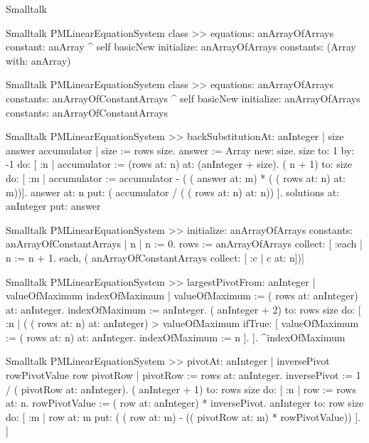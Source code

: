 \begin{displaycode}{Smalltalk}
\begin{displaycode}{Smalltalk}
PMLinearEquationSystem class >> equations: anArrayOfArrays constant: anArray 
  ^ self basicNew
      initialize: anArrayOfArrays 
      constants: (Array with: anArray)
\end{displaycode}

\begin{displaycode}{Smalltalk}
PMLinearEquationSystem class >> equations: anArrayOfArrays constants: anArrayOfConstantArrays
  ^ self basicNew 
      initialize: anArrayOfArrays
      constants: anArrayOfConstantArrays
\end{displaycode}

\begin{displaycode}{Smalltalk}
PMLinearEquationSystem >> backSubstitutionAt: anInteger
    | size answer accumulator |
    size := rows size.
    answer := Array new: size.
    size to: 1 by: -1 do:
        [ :n |
          accumulator := (rows at: n) at: (anInteger + size).
          ( n + 1) to: size
            do: [ :m | accumulator := accumulator - ( ( answer at: m) 
                                           * ( ( rows at: n) at: m))].
          answer at: n put: ( accumulator / ( ( rows at: n) at: n)) ].
    solutions at: anInteger put: answer
\end{displaycode}

\begin{displaycode}{Smalltalk}
PMLinearEquationSystem >> initialize: anArrayOfArrays constants: anArrayOfConstantArrays
    | n |
    n := 0.
    rows := anArrayOfArrays collect: [ :each | n := n + 1. each, ( 
                   anArrayOfConstantArrays collect: [ :c | c at: n])]
\end{displaycode}

\begin{displaycode}{Smalltalk}
PMLinearEquationSystem >> largestPivotFrom: anInteger
    | valueOfMaximum indexOfMaximum |
    valueOfMaximum := ( rows at: anInteger) at: anInteger.
    indexOfMaximum := anInteger.
    ( anInteger + 2) to: rows size do:
        [ :n |
          ( ( rows at: n) at: anInteger) > valueOfMaximum
                ifTrue: [ valueOfMaximum := ( rows at: n) at: 
                                                            anInteger.
                             indexOfMaximum := n ].
        ].
    ^indexOfMaximum 
\end{displaycode}

\begin{displaycode}{Smalltalk}
PMLinearEquationSystem >> pivotAt: anInteger
    | inversePivot rowPivotValue row pivotRow |
    pivotRow := rows at: anInteger.
    inversePivot := 1 / ( pivotRow at: anInteger).
    ( anInteger + 1) to: rows size do:
        [ :n |
          row := rows at: n.
          rowPivotValue := ( row at: anInteger) * inversePivot.
          anInteger to: row size do:
            [ :m |
              row at: m put: ( ( row at: m) - (( pivotRow at: m) * 
                                                      rowPivotValue)) ].
        ]
\end{displaycode}


\end{displaycode}
